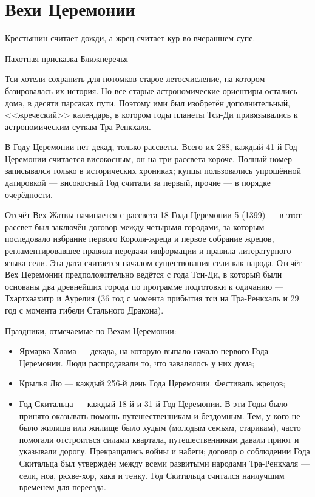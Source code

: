 \section*{Вехи Церемонии}

\epigraph{
Крестьянин считает дожди, а жрец считает кур во вчерашнем супе.
}{
Пахотная присказка Ближнеречья
}

Тси хотели сохранить для потомков старое летосчисление, на котором базировалась их история.
Но все старые астрономические ориентиры остались дома, в десяти парсаках пути.
Поэтому ими был изобретён дополнительный, <<жреческий>> календарь, в котором годы планеты Тси-Ди привязывались к астрономическим суткам Тра-Ренкхаля.

В Году Церемонии нет декад, только рассветы.
Всего их 288, каждый 41-й Год Церемонии считается високосным, он на три рассвета короче.
Полный номер записывался только в исторических хрониках;
купцы пользовались упрощённой датировкой --- високосный Год считали за первый, прочие --- в порядке очерёдности.

Отсчёт Вех Жатвы начинается с рассвета 18 Года Церемонии 5 (1399) --- в этот рассвет был заключён договор между четырьмя городами, за которым последовало избрание первого Короля-жреца и первое собрание жрецов, регламентировавшее правила передачи информации и правила литературного языка сели.
Эта дата считается началом существования сели как народа.
Отсчёт Вех Церемонии предположительно ведётся с года Тси-Ди, в который были основаны два древнейших города по программе подготовки к одичанию --- Тхартхаахитр и Аурелия (36 год с момента прибытия тси на Тра-Ренкхаль и 29 год с момента гибели Стального Дракона).

Праздники, отмечаемые по Вехам Церемонии:

\begin{itemize}
\item Ярмарка Хлама --- декада, на которую выпало начало первого Года Церемонии.
Люди распродавали то, что завалялось у них дома;
\item Крылья Лю --- каждый 256-й день Года Церемонии. Фестиваль жрецов;
\item Год Скитальца --- каждый 18-й и 31-й Год Церемонии. В эти Годы было принято оказывать помощь путешественникам и бездомным.
Тем, у кого не было жилища или жилище было худым (молодым семьям, старикам), часто помогали отстроиться силами квартала, путешественникам давали приют и указывали дорогу.
Прекращались войны и набеги;
договор о соблюдении Года Скитальца был утверждён между всеми развитыми народами Тра-Ренкхаля --- сели, ноа, ркхве-хор, хака и тенку.
Год Скитальца считался наилучшим временем для переезда.
\end{itemize}

